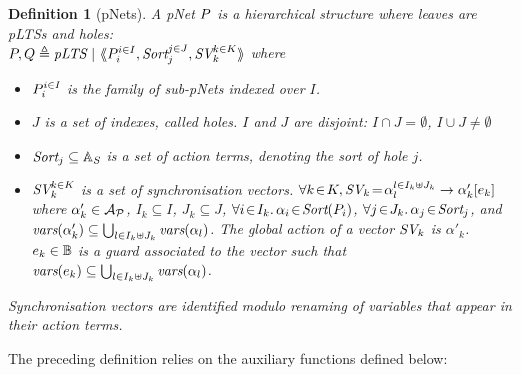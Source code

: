 \documentclass{lmcs}
\newtheorem{definition}{Definition}
\begin{document}
\begin{definition}[pNets]\label{def-pnets}
A pNet $\pNet$ is a hierarchical structure where leaves are pLTSs and holes:\\
$\pNet,\pNetQ\triangleq \pLTS~|~\mylangle \pNet_i^{i\in I}, \Sort_j^{j\in J}, \symb{SV}_k^{k\in 
K}\myrangle$
where
\begin{itemize}
\item[$\bullet$] $\pNet_i^{i\in I}$ is the family of sub-pNets indexed over $I$.

\item[$\bullet$] $J$ is a set of indexes, called \emph{holes}.
$I$ and $J$ are \emph{disjoint}: $I\!\cap\! J=\emptyset$,  $I\!\cup\! J\neq\emptyset$
\item[$\bullet$] $\Sort_j \subseteq \AlgAS$ is a set of action terms, denoting the 
\emph{sort} of
hole $j$.

\item[$\bullet$] $\symb{SV}_k^{k\in K}$ is a set of
  synchronisation vectors. $\forall k\!\in\! K,
  \symb{SV}_k\!=\!\SV{\alpha_{l}^{l\in I_k \uplus J_k}}{\alpha'_k}{e_k}$ where
  $\alpha'_k\in \mathcal{A}_\P$, $I_k\subseteq I$, $J_k\subseteq J$,
  $\forall i\!\in\!
  I_k.\,\alpha_{i}\!\in\!\Sort(\pNet_i)$,  $\forall j\!\in\!
  J_k.\,\alpha_{j}\!\in\!\Sort_j$, and $\vars(\alpha'_k)\subseteq \bigcup_{l\in I_k\uplus 
  J_k}{\vars({\alpha_l})}$. The global action of a vector $\symb{SV}_k$ is
$\alpha'_k$. $e_k \in \AlgB$ is a guard associated to the vector such that
$\vars(e_k)\subseteq \bigcup_{l\in I_k\uplus J_k}{\vars({\alpha_l})}$.
\end{itemize}
Synchronisation vectors are identified modulo renaming of variables that appear in their 
action terms.
\end{definition}

The preceding definition relies on the auxiliary functions defined below:
\end{document}
